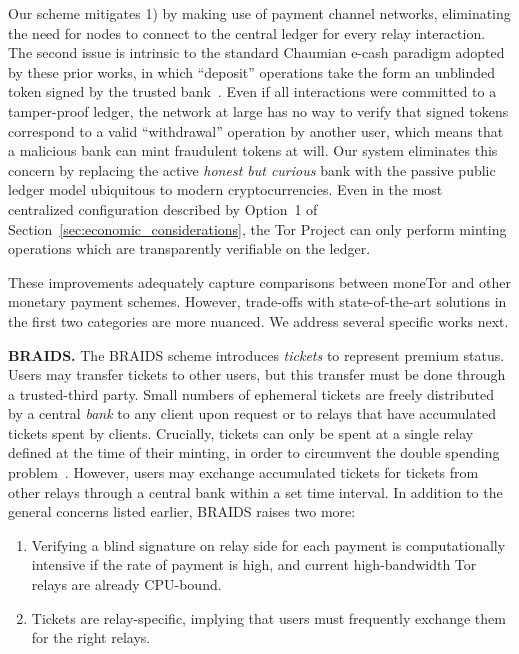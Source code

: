 Our scheme mitigates 1) by making use of payment channel networks, eliminating the need for nodes to connect to the central ledger for every relay interaction.
The second issue is intrinsic to the standard Chaumian e-cash paradigm adopted by these prior works, in which ``deposit'' operations take the form an unblinded token signed by the trusted bank~\cite{chaum1988untraceable}.
Even if all interactions were committed to a tamper-proof ledger, the network at large has no way to verify that signed tokens correspond to a valid ``withdrawal'' operation by another user, which means that a malicious bank can mint fraudulent tokens at will.
Our system eliminates this concern by replacing the active \emph{honest but curious} bank with the passive public ledger model ubiquitous to modern cryptocurrencies.
Even in the most centralized configuration described by Option~1 of Section~\ref{sec:economic_considerations}, the Tor Project can only perform minting operations which are transparently verifiable on the ledger.

These improvements adequately capture comparisons between moneTor and other monetary payment schemes.
However, trade-offs with state-of-the-art solutions in the first two categories are more nuanced.
We address several specific works next.

\medskip\noindent\textbf{BRAIDS.}
The BRAIDS scheme introduces \emph{tickets} to represent premium status.
Users may transfer tickets to other users, but this transfer must be done through a trusted-third party.
Small numbers of ephemeral tickets are freely distributed by a central \emph{bank} to any client upon request or to relays that have accumulated tickets spent by clients.
Crucially, tickets can only be spent at a single relay defined at the time of their minting, in order to circumvent the double spending problem~\cite{jansen2010recruiting}.
However, users may exchange accumulated tickets for tickets from other relays through a central bank within a set time interval.
In addition to the general concerns listed earlier, BRAIDS raises two more:

\begin{enumerate}[resume]
\item Verifying a blind signature on relay side for each payment is computationally intensive if the rate of payment is high, and current high-bandwidth Tor relays are already CPU-bound.
\item Tickets are relay-specific, implying that users must frequently exchange them for the right relays.
\end{enumerate}

